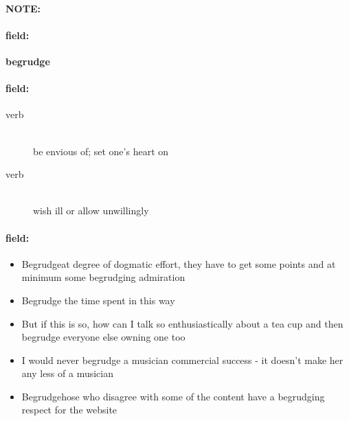 \documentclass[12pt]{article}
\newenvironment{note}{\paragraph{NOTE:}}{}
\newenvironment{field}{\paragraph{field:}}{}
\begin{document}
\begin{note}
\begin{field}
\textbf{\large begrudge}
\end{field}


\begin{field}
\begin{description}
\item[verb] \hfill \\ 
be envious of; set one's heart on

\item[verb] \hfill \\ 
wish ill or allow unwillingly

\end{description}
\end{field}

\begin{field}
\begin{itemize}
\item Begrudgeat degree of dogmatic effort, they have to get some points and at minimum some begrudging admiration
\item Begrudge the time spent in this way
\item But if this is so, how can I talk so enthusiastically about a tea cup and then begrudge everyone else owning one too
\item I would never begrudge a musician commercial success - it doesn't make her any less of a musician
\item Begrudgehose who disagree with some of the content have a begrudging respect for the website
\end{itemize}
\end{field}
\end{note}
\end{document}

